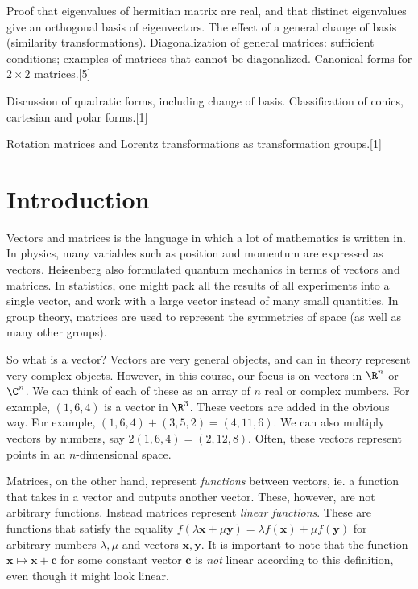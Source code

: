 \documentclass[a4paper]{article}
\begin{document}
{\vspace{5pt}
\noindent Proof that eigenvalues of hermitian matrix are real, and that distinct eigenvalues give an orthogonal basis of eigenvectors. The effect of a general change of basis (similarity transformations). Diagonalization of general matrices: sufficient conditions; examples of matrices that cannot be diagonalized. Canonical forms for $2 \times 2$ matrices.\hspace*{\fill}[5]

\vspace{5pt}
\noindent Discussion of quadratic forms, including change of basis. Classification of conics, cartesian and polar forms.\hspace*{\fill}[1]

\vspace{5pt}
\noindent Rotation matrices and Lorentz transformations as transformation groups.\hspace*{\fill}[1]}

\tableofcontents

\setcounter{section}{-1}
\section{Introduction}
Vectors and matrices is the language in which a lot of mathematics is written in. In physics, many variables such as position and momentum are expressed as vectors. Heisenberg also formulated quantum mechanics in terms of vectors and matrices. In statistics, one might pack all the results of all experiments into a single vector, and work with a large vector instead of many small quantities. In group theory, matrices are used to represent the symmetries of space (as well as many other groups).

So what is a vector? Vectors are very general objects, and can in theory represent very complex objects. However, in this course, our focus is on vectors in $\R^n$ or $\C^n$. We can think of each of these as an array of $n$ real or complex numbers. For example, $(1, 6, 4)$ is a vector in $\R^3$. These vectors are added in the obvious way. For example, $(1, 6, 4) + (3, 5, 2) = (4, 11, 6)$. We can also multiply vectors by numbers, say $2(1, 6, 4) = (2, 12, 8)$. Often, these vectors represent points in an $n$-dimensional space.

Matrices, on the other hand, represent \emph{functions} between vectors, ie. a function that takes in a vector and outputs another vector. These, however, are not arbitrary functions. Instead matrices represent \emph{linear functions}. These are functions that satisfy the equality $f(\lambda \mathbf{x} + \mu \mathbf{y}) = \lambda f(\mathbf{x}) + \mu f(\mathbf{y})$ for arbitrary numbers $\lambda, \mu$ and vectors $\mathbf{x}, \mathbf{y}$. It is important to note that the function $\mathbf{x} \mapsto \mathbf{x} + \mathbf{c}$ for some constant vector $\mathbf{c}$ is \emph{not} linear according to this definition, even though it might look linear.
\end{document}
